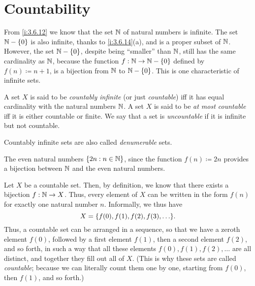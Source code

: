 \section{Countability}\label{i:sec:8.1}

\begin{note}
  From \cref{i:3.6.12} we know that the set \(\mathbb{N}\) of natural numbers is infinite.
  The set \(\mathbb{N} - \left\lbrace0\right\rbrace\) is also infinite, thanks to \cref{i:3.6.14}(a), and is a proper subset of \(\mathbb{N}\).
  However, the set \(\mathbb{N} - \left\lbrace0\right\rbrace\), despite being ``smaller'' than \(\mathbb{N}\), still has the same cardinality as \(\mathbb{N}\), because the function \(f : \mathbb{N} \to \mathbb{N} - \left\lbrace0\right\rbrace\) defined by \(f(n) \coloneqq n + 1\), is a bijection from \(\mathbb{N}\) to \(\mathbb{N} - \left\lbrace0\right\rbrace\).
  This is one characteristic of infinite sets.
\end{note}

\begin{defn}\label{i:8.1.1}
  A set \(X\) is said to be \emph{countably infinite} (or just \emph{countable}) iff it has equal cardinality with the natural numbers \(\mathbb{N}\).
  A set \(X\) is said to be \emph{at most countable} iff it is either countable or finite.
  We say that a set is \emph{uncountable} if it is infinite but not countable.
\end{defn}

\begin{rmk}\label{i:8.1.2}
  Countably infinite sets are also called \emph{denumerable} sets.
\end{rmk}

\begin{eg}\label{i:8.1.3}
  The even natural numbers \(\left\lbrace2n : n \in \mathbb{N}\right\rbrace\), since the function \(f(n) \coloneqq 2n\) provides a bijection between \(\mathbb{N}\) and the even natural numbers.
\end{eg}

\begin{note}
  Let \(X\) be a countable set.
  Then, by definition, we know that there exists a bijection \(f : \mathbb{N} \to X\).
  Thus, every element of \(X\) can be written in the form \(f(n)\) for exactly one natural number \(n\).
  Informally, we thus have
  \[
    X = \set{f(0), f(1), f(2), f(3), \dots}.
  \]
  Thus, a countable set can be arranged in a sequence, so that we have a zeroth element \(f(0)\), followed by a first element \(f(1)\), then a second element \(f(2)\), and so forth, in such a way that all these elements \(f(0), f(1), f(2), \dots\) are all distinct, and together they fill out all of \(X\).
  (This is why these sets are called \emph{countable};
  because we can literally count them one by one, starting from \(f(0)\), then \(f(1)\), and so forth.)
\end{note}

